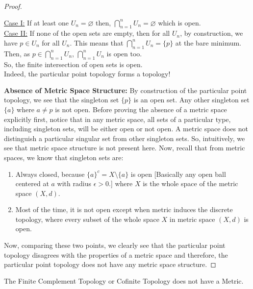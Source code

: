 \begin{proof}
\begin{enumerate}
        \underline{Case I:} If at least one $U_n=\varnothing$ then, $\bigcap_{n=1}^nU_n=\varnothing$ which is open.\\
        \underline{Case II:} If none of the open sets are empty, then for all $U_n$, by construction, we have $p\in U_n$ for all $U_n$. This means that $\bigcap_{n=1}^n U_n=\{p\}$ at the bare minimum. Then, as $p\in\bigcap_{n=1}^n U_n$, $\bigcap_{n=1}^n U_n$ is open too.\\
        So, the finite intersection of open sets is open.\\
        Indeed, the particular point topology forms a topology!
    \end{enumerate}
    \textbf{Absence of Metric Space Structure:} By construction of the particular point topology, we see that the singleton set $\{p\}$ is an open set. Any other singleton set $\{a\}$ where $a\neq p$ is not open. Before proving the absence of a metric space explicitly first, notice that in any metric space, all sets of a particular type, including singleton sets, will be either open or not open. A metric space does not distinguish a particular singular set from other singleton sets. So, intuitively, we see that metric space structure is not present here. Now, recall that from metric spaces, we know that singleton sets are:
    \begin{enumerate}
        \item Always closed, because $\{a\}^c=X\setminus\{a\}$ is open [Basically any open ball centered at $a$ with radius $\epsilon>0$.] where $X$ is the whole space of the metric space $(X,d)$.
        \item Most of the time, it is not open except when metric induces the discrete topology, where every subset of the whole space $X$ in metric space $(X,d)$ is open.
    \end{enumerate}
    Now, comparing these two points, we clearly see that the particular point topology disagrees with the properties of a metric space and therefore, the particular point topology does not have any metric space structure.
\end{proof}
\begin{Example}\label{finite_complement_topology}
    The Finite Complement Topology or Cofinite Topology does not have a Metric.
\end{Example}
